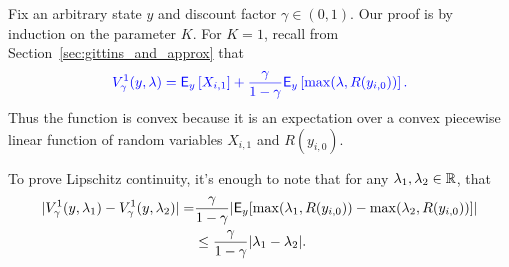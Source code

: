 \begin{myproof}[Proof.]
	Fix an arbitrary state $y$ and discount factor $\gamma \in (0,1)$. Our proof is by induction on the parameter $K$. For $K = 1$, recall from Section~\ref{sec:gittins_and_approx} that
	\begin{align*}
	{\color{blue} V^1_\gamma(y, \lambda) = \ensuremath{\mathsf{E}}_y\left[X_{i,1} \right] +  \frac{\gamma}{1-\gamma} \ensuremath{\mathsf{E}}_y\left[\max(\lambda, R(y_{i,0}))\right].}
	\end{align*}
	Thus the function is convex because it is an expectation over a convex piecewise linear function of random variables $X_{i,1}$ and $R(y_{i,0})$.
	{\color{blue}To prove Lipschitz continuity, it's enough to note that
	for any $\lambda_1, \lambda_2 \in \mathbb{R}$, that
	\begin{align*}
		| V^1_\gamma(y, \lambda_1) - V^1_\gamma(y, \lambda_2)| = & \frac{\gamma}{1-\gamma} |\mathsf{E}_y[\max(\lambda_1, R(y_{i,0})) - \max(\lambda_2, R(y_{i,0}))  ]  | \\
	& \leq \frac{\gamma}{1-\gamma} |\lambda_1 - \lambda_2 |	.
	\end{align*}
		
	}
	

\end{myproof}
